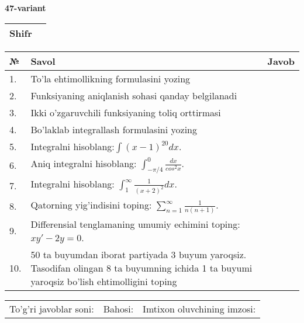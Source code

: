 \documentclass{article}
\begin{document}
  \egroup
  
  \newpage
  
  
  \textbf{47-variant}\\
  
  \bgroup
  \def\arraystretch{1.6} %
  
  \begin{tabular}{|m{5.7cm}|m{9.5cm}|}
  \hline
  Shifr & \\
  \hline
  \end{tabular}
  
  \vspace{1cm}
  
  \begin{tabular}{|m{0.7cm}|m{10cm}|m{4cm}|}
  \hline
  № & Savol & Javob \\
  \hline
  1. & To'la ehtimollikning formulasini yozing &  \\
  \hline
  2. & Funksiyaning aniqlanish sohasi qanday belgilanadi &  \\
  \hline
  3. & Ikki o'zgaruvchili funksiyaning toliq orttirmasi &  \\
  \hline
  4. & Bo'laklab integrallash formulasini yozing &  \\
  \hline
  5. & Integralni hisoblang:\(\int {(x - 1)^{20}}dx\). &  \\
  \hline
  6. & Aniq integralni hisoblang: \(\int_{- \pi/4}^{0}\frac{dx}{cos^{2}x}\). &  \\
  \hline
  7. & Integralni hisoblang: \(\int_{1}^{\infty}{\frac{1}{(x + 2)^{2}}dx}\). &  \\
  \hline
  8. & Qatorning yig'indisini toping: \(\sum_{n = 1}^{\infty}\frac{1}{n(n + 1)}\). &  \\
  \hline
  9. & Differensial tenglamaning umumiy echimini toping: \(xy' - 2y = 0\). &  \\
  \hline
  10. & 50 ta buyumdan iborat partiyada 3 buyum yaroqsiz. Tasodifan olingan 8 ta buyumning ichida 1 ta buyumi yaroqsiz bo'lish ehtimolligini toping &  \\
  \hline
  \end{tabular}
  
  \vspace{1cm}
  
  \begin{tabular}{lll}
  To'g'ri javoblar soni: \underline{\hspace{1.5cm}} & 
  Bahosi: \underline{\hspace{1.5cm}} & 
  Imtixon oluvchining imzosi: \underline{\hspace{2cm}} \\
  \end{tabular}
  
\end{document}
